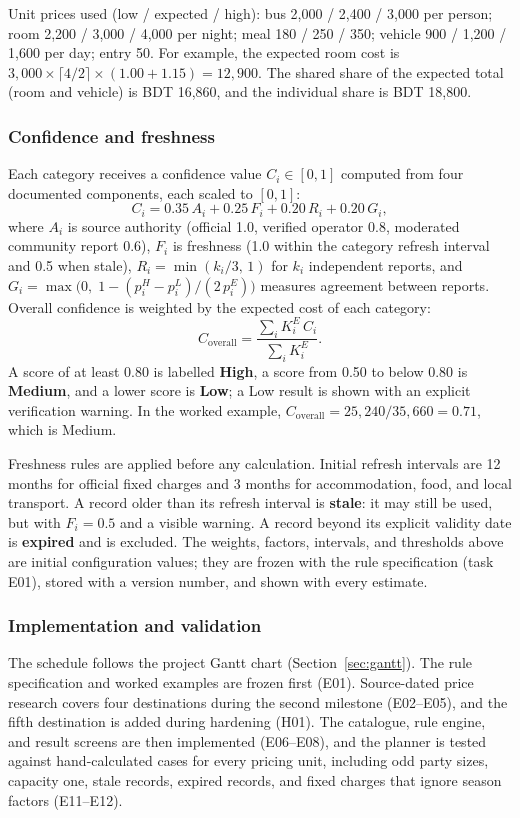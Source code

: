 \documentclass[11pt,a4paper]{article}
\begin{document}
Unit prices used (low / expected / high): bus 2,000 / 2,400 / 3,000 per person; room 2,200 / 3,000 / 4,000 per night; meal 180 / 250 / 350; vehicle 900 / 1,200 / 1,600 per day; entry 50. For example, the expected room cost is $3{,}000 \times \lceil 4/2 \rceil \times (1.00 + 1.15) = 12{,}900$. The shared share of the expected total (room and vehicle) is BDT 16,860, and the individual share is BDT 18,800.

\subsubsection{Confidence and freshness}
Each category receives a confidence value $C_i \in [0, 1]$ computed from four documented components, each scaled to $[0,1]$:
\begin{equation}
C_i = 0.35\,A_i + 0.25\,F_i + 0.20\,R_i + 0.20\,G_i,
\label{eq:conf}
\end{equation}
where $A_i$ is source authority (official 1.0, verified operator 0.8, moderated community report 0.6), $F_i$ is freshness (1.0 within the category refresh interval and 0.5 when stale), $R_i = \min(k_i/3,\,1)$ for $k_i$ independent reports, and $G_i = \max\!\bigl(0,\; 1 - (p_i^{H} - p_i^{L}) / (2\,p_i^{E})\bigr)$ measures agreement between reports. Overall confidence is weighted by the expected cost of each category:
\begin{equation}
C_{\mathrm{overall}} = \frac{\sum_i K_i^{E}\, C_i}{\sum_i K_i^{E}}.
\label{eq:overall}
\end{equation}
A score of at least 0.80 is labelled \textbf{High}, a score from 0.50 to below 0.80 is \textbf{Medium}, and a lower score is \textbf{Low}; a Low result is shown with an explicit verification warning. In the worked example, $C_{\mathrm{overall}} = 25{,}240 / 35{,}660 = 0.71$, which is Medium.

Freshness rules are applied before any calculation. Initial refresh intervals are 12 months for official fixed charges and 3 months for accommodation, food, and local transport. A record older than its refresh interval is \textbf{stale}: it may still be used, but with $F_i = 0.5$ and a visible warning. A record beyond its explicit validity date is \textbf{expired} and is excluded. The weights, factors, intervals, and thresholds above are initial configuration values; they are frozen with the rule specification (task E01), stored with a version number, and shown with every estimate.

\subsubsection{Implementation and validation}\label{sec:planner-validation}
The schedule follows the project Gantt chart (Section~\ref{sec:gantt}). The rule specification and worked examples are frozen first (E01). Source-dated price research covers four destinations during the second milestone (E02--E05), and the fifth destination is added during hardening (H01). The catalogue, rule engine, and result screens are then implemented (E06--E08), and the planner is tested against hand-calculated cases for every pricing unit, including odd party sizes, capacity one, stale records, expired records, and fixed charges that ignore season factors (E11--E12).
\end{document}
